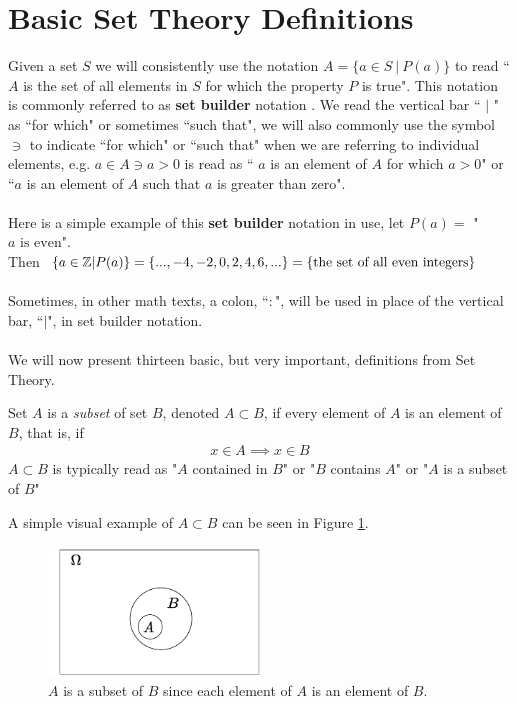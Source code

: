 \section{Basic Set Theory Definitions}
Given a set $S$ we will consistently use the notation $A=\{a\in S\ |\ P(a)\}$ to read `` $A$ is the set of all elements in $S$ for which the property $P$ is true". This notation is commonly referred to as \textbf{set builder} notation . We read the vertical bar `` $|$ " as ``for which" or sometimes ``such that", we will also commonly use the symbol $\ni$ to indicate ``for which" or ``such that" when we are referring to individual elements, e.g. $a\in A \ni a>0$ is read as `` $a$ is an element of $A$ for which $a>0$" or ``$a$ is an element of $A$ such that $a$ is greater than zero". \\ \\
\noindent Here is a simple example of this \textbf{set builder} notation in use, let $P(a)=$ "$a \text{ is even}$". \\
Then $\{a\in {\mathbb{ Z}} | P(a)\} = \{...,-4,-2,0,2,4,6,...\} = \{ \text{the set of all even integers}\}$ \\ \\
Sometimes, in other math texts, a colon, ``$:$", will be used in place of the vertical bar, ``$|$", in set builder notation.\\ \\
\noindent We will now present thirteen basic, but very important, definitions from Set Theory. \newpage
\begin{definition}[Subset]\index{$\subset$}
Set $A$ is a \textit{subset} of set $B$, denoted $A\subset B$, if every element of $A$ is an element of $B$, that is, if
\begin{align}
    x\in A \implies x\in B \nonumber
\end{align}
$A\subset B$ is typically read as "$A$ contained in $B$" or "$B$ contains $A$" or "$A$ is a subset of $B$"
\end{definition}
A simple visual example of $A\subset B$ can be seen in Figure \ref{fig:Subset_example}.
\begin{figure}[h!]
    \centering
    \includegraphics[width=0.5\textwidth]{Figures/SUBSET_Example.pdf}
    \caption{$A$ is a subset of $B$ since each element of $A$ is an element of $B$.}
    \label{fig:Subset_example}
\end{figure}\\
